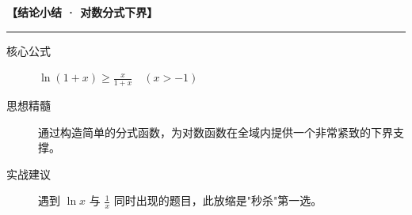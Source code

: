 \begin{summarybox}
\textbf{【结论小结 · 对数分式下界】}
\vspace{0.8em}
\hrule
\vspace{0.8em}

\begin{description}
    \item[核心公式] $\ln(1+x) \geqslant \frac{x}{1+x} \quad (x > -1)$
    \item[思想精髓] 通过构造简单的分式函数，为对数函数在全域内提供一个非常紧致的下界支撑。
    \item[实战建议] 遇到 $\ln x$ 与 $\frac{1}{x}$ 同时出现的题目，此放缩是"秒杀"第一选。
\end{description}
\end{summarybox}